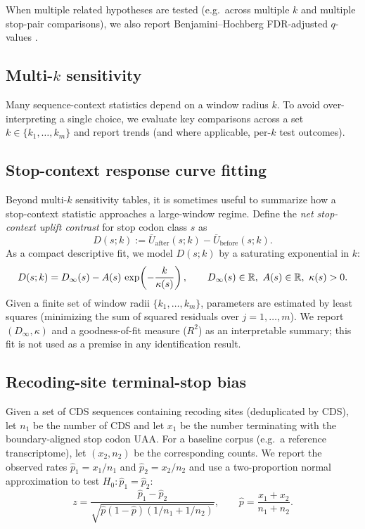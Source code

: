 When multiple related hypotheses are tested (e.g.\ across multiple $k$ and multiple stop-pair comparisons), we also report Benjamini--Hochberg FDR-adjusted $q$-values \cite{BenjaminiHochberg1995}.

\subsection{Multi-\texorpdfstring{$k$}{k} sensitivity}
\label{app:multi_k_sensitivity}

Many sequence-context statistics depend on a window radius $k$.
To avoid over-interpreting a single choice, we evaluate key comparisons across a set $k\in\{k_1,\dots,k_m\}$ and report trends (and where applicable, per-$k$ test outcomes).

\subsection{Stop-context response curve fitting}
\label{app:stop_context_fit}

Beyond multi-$k$ sensitivity tables, it is sometimes useful to summarize how a stop-context statistic approaches a large-window regime.
Define the \emph{net stop-context uplift contrast} for stop codon class $s$ as
\[
D(s;k):=\overline{U}_{\mathrm{after}}(s;k)-\overline{U}_{\mathrm{before}}(s;k).
\]
As a compact descriptive fit, we model $D(s;k)$ by a saturating exponential in $k$:
\[
D(s;k)=D_{\infty}(s)-A(s)\,\exp\!\left(-\frac{k}{\kappa(s)}\right),
\qquad D_{\infty}(s)\in\mathbb{R},\ A(s)\in\mathbb{R},\ \kappa(s)>0.
\]
Given a finite set of window radii $\{k_1,\dots,k_m\}$, parameters are estimated by least squares (minimizing the sum of squared residuals over $j=1,\dots,m$).
We report $(D_{\infty},\kappa)$ and a goodness-of-fit measure ($R^2$) as an interpretable summary; this fit is not used as a premise in any identification result.

\subsection{Recoding-site terminal-stop bias}
\label{app:recoding_stop_bias}

Given a set of CDS sequences containing recoding sites (deduplicated by CDS), let $n_1$ be the number of CDS and let $x_1$ be the number terminating with the boundary-aligned stop codon $\mathrm{UAA}$.
For a baseline corpus (e.g.\ a reference transcriptome), let $(x_2,n_2)$ be the corresponding counts.
We report the observed rates $\widehat{p}_1=x_1/n_1$ and $\widehat{p}_2=x_2/n_2$ and use a two-proportion normal approximation to test $H_0:\widehat{p}_1=\widehat{p}_2$:
\[
z=\frac{\widehat{p}_1-\widehat{p}_2}{\sqrt{\widehat{p}(1-\widehat{p})(1/n_1+1/n_2)}},
\qquad
\widehat{p}=\frac{x_1+x_2}{n_1+n_2}.
\]

